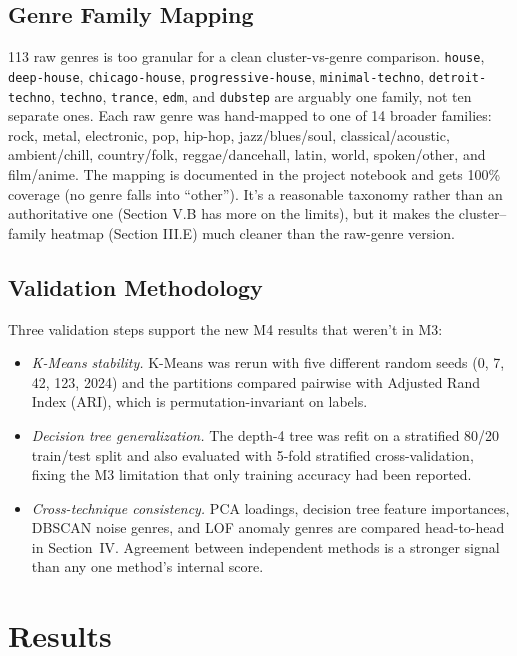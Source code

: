 \documentclass[10pt,twocolumn]{article}
\begin{document}
\subsection{Genre Family Mapping}
113 raw genres is too granular for a clean cluster-vs-genre comparison. \texttt{house}, \texttt{deep-house}, \texttt{chicago-house}, \texttt{progressive-house}, \texttt{minimal-techno}, \texttt{detroit-techno}, \texttt{techno}, \texttt{trance}, \texttt{edm}, and \texttt{dubstep} are arguably one family, not ten separate ones. Each raw genre was hand-mapped to one of 14 broader families: rock, metal, electronic, pop, hip-hop, jazz/blues/soul, classical/acoustic, ambient/chill, country/folk, reggae/dancehall, latin, world, spoken/other, and film/anime. The mapping is documented in the project notebook and gets 100\% coverage (no genre falls into ``other''). It's a reasonable taxonomy rather than an authoritative one (Section V.B has more on the limits), but it makes the cluster--family heatmap (Section III.E) much cleaner than the raw-genre version.

\subsection{Validation Methodology}
Three validation steps support the new M4 results that weren't in M3:
\begin{itemize}
    \item \emph{K-Means stability.} K-Means was rerun with five different random seeds (0, 7, 42, 123, 2024) and the partitions compared pairwise with Adjusted Rand Index (ARI), which is permutation-invariant on labels.
    \item \emph{Decision tree generalization.} The depth-4 tree was refit on a stratified 80/20 train/test split and also evaluated with 5-fold stratified cross-validation, fixing the M3 limitation that only training accuracy had been reported.
    \item \emph{Cross-technique consistency.} PCA loadings, decision tree feature importances, DBSCAN noise genres, and LOF anomaly genres are compared head-to-head in Section~IV. Agreement between independent methods is a stronger signal than any one method's internal score.
\end{itemize}

\section{Results}
\end{document}
